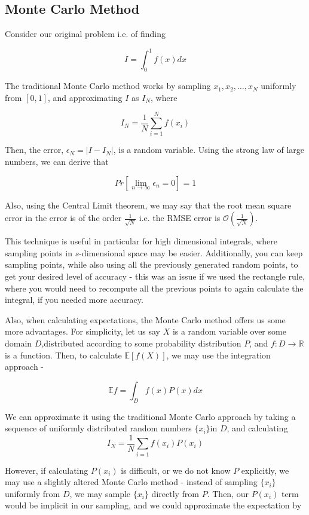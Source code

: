 \documentclass[12pt,letterpaper, twoside]{article}
\theoremstyle{definition}
\begin{document}
\subsection{Monte Carlo Method}

Consider our original problem i.e. of finding 

$$
I = \int_{0}^{1}f(x)dx
$$

The traditional Monte Carlo \cite{owenReport}\cite{kuoReport} method works by sampling $x_1,x_2,\ldots,x_N$ uniformly from $[0,1]$, and approximating $I$ as $I_N$, where

\begin{equation}
    I_N = \frac{1}{N}\sum_{i=1}^{N}f(x_i)
\end{equation}


Then, the error, $\epsilon_N = |I - I_N|$, is a random variable. Using the  strong law of large numbers, we can derive that

$$
Pr[\lim_{n \to \infty} \epsilon_n = 0] = 1
$$ 

Also, using the Central Limit theorem, we may say that the root mean square error in the error is of the order $\frac{1}{\sqrt{N}}$ i.e. the RMSE error is $\mathcal{O}(\frac{1}{\sqrt{N}})$.

This technique is useful in particular for high dimensional integrals, where sampling points in $s$-dimensional space may be easier. Additionally, you can keep sampling points, while also using all the previously generated random points, to get your desired level of accuracy - this was an issue if we used the rectangle rule, where you would need to recompute all the previous points to again calculate the integral, if you needed more accuracy.

Also, when calculating expectations, the Monte Carlo method offers us some more advantages. For simplicity, let us say $X$ is a random
variable over some domain $D$,distributed according to some probability distribution $P$, and $f:D \to \mathbb{R}$ is a function. Then, to calculate $\mathbb{E}[f(X)]$, we may use the
integration approach - 

$$
\mathbb{E}f = \int_D f(x)P(x)dx
$$

We can approximate it using the traditional Monte Carlo approach by taking a sequence of uniformly distributed random numbers $\{x_i\}$in $D$, and calculating $$
I_N = \frac{1}{N}\sum_{i=1}f(x_i)P(x_i)
$$

However, if calculating $P(x_i)$ is difficult, or we do not know $P$ explicitly, we may use a slightly altered Monte Carlo method - instead of sampling  $\{x_i\}$ uniformly from $D$, we may sample $\{x_i\}$ directly from $P$. Then, our $P(x_i)$ term would be implicit in our sampling, and we could approximate the expectation by
\end{document}
